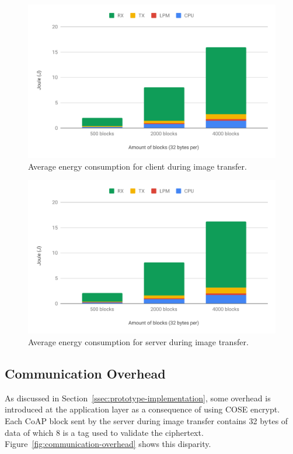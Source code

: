 \documentclass[0-thesis.tex]{subfiles}
\begin{document}
\begin{figure}[]
    \caption{Average energy consumption for client during image transfer.}
    \label{fig:client-image-energy}
    \includegraphics[scale=0.65]{images/client-image-energy.pdf}
\end{figure}

\begin{figure}[]
    \caption{Average energy consumption for server during image transfer.}
    \label{fig:server-image-energy}
    \includegraphics[scale=0.65]{images/server-image-energy.pdf}
\end{figure}

\newpage    %
\subsection{Communication Overhead}
\label{ssec:communication-overhead}
As discussed in Section~\ref{ssec:prototype-implementation}, some overhead is introduced
at the application layer as a consequence of using COSE encrypt. Each CoAP block sent by
the server during image transfer contains 32 bytes of data of which 8 is a tag used to
validate the ciphertext. Figure~\ref{fig:communication-overhead} shows this disparity.
\end{document}

